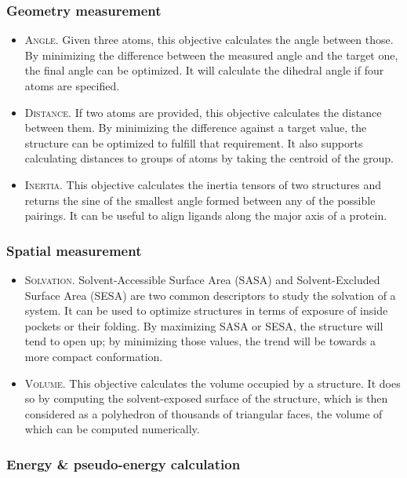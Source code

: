 \subsubsection{Geometry measurement}
\begin{itemize}
	\item \textsc{Angle}. Given three atoms, this objective calculates the angle between those. By minimizing the difference between the measured angle and the target one, the final angle can be optimized. It will calculate the dihedral angle if four atoms are specified.

	\item \textsc{Distance}. If two atoms are provided, this objective calculates the distance between them. By minimizing the difference against a target value, the structure can be optimized to fulfill that requirement. It also supports calculating distances to groups of atoms by taking the centroid of the group.

	\item \textsc{Inertia}. This objective calculates the inertia tensors of two structures and returns the sine of the smallest angle formed between any of the possible pairings. It can be useful to align ligands along the major axis of a protein.


\end{itemize}\subsubsection{Spatial measurement}
\begin{itemize}
	\item \textsc{Solvation}. Solvent-Accessible Surface Area (SASA) and Solvent-Excluded Surface Area (SESA) are two common descriptors to study the solvation of a system. It can be used to optimize structures in terms of exposure of inside pockets or their folding. By maximizing SASA or SESA, the structure will tend to open up; by minimizing those values, the trend will be towards a more compact conformation.

	\item \textsc{Volume}. This objective calculates the volume occupied by a structure. It does so by computing the solvent-exposed surface of the structure, which is then considered as a polyhedron of thousands of triangular faces, the volume of which can be computed numerically.


\end{itemize}\subsubsection{Energy \& pseudo-energy calculation}
